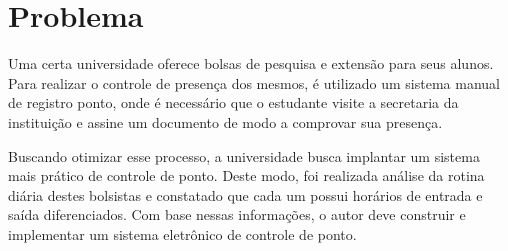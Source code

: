\section{Problema}

Uma certa universidade oferece bolsas de pesquisa e extensão para seus alunos. Para realizar o controle de presença dos mesmos, é utilizado um sistema manual de registro ponto, onde é necessário que o estudante visite a secretaria da instituição e assine um documento de modo a comprovar sua presença.

Buscando otimizar esse processo, a universidade busca implantar um sistema mais prático de controle de ponto. Deste modo, foi realizada análise da rotina diária destes bolsistas e constatado que cada um possui horários de entrada e saída diferenciados. Com base nessas informações, o autor deve construir e implementar um sistema eletrônico de controle de ponto.